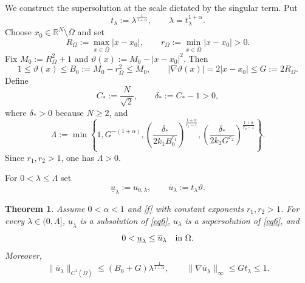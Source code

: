 \documentclass[11pt,leqno]{amsart}
\newtheorem{theorem}{Theorem}[section]
\begin{document}
We construct the supersolution at the scale dictated by the singular
term. Put
\[
 t_\lambda:=\lambda^{\frac1{1+\alpha}},\qquad
 \lambda=t_\lambda^{1+\alpha}.
\]
Choose $x_0\in\mathbb R^N\setminus\overline\Omega$ and set
\[
 R_\Omega:=\max_{x\in\overline\Omega}|x-x_0|,\qquad
 r_\Omega:=\min_{x\in\overline\Omega}|x-x_0|>0.
\]
Fix $M_0:=R_\Omega^2+1$ and $\vartheta(x):=M_0-|x-x_0|^2$. Then
\begin{equation}\label{beta-bounds}
1\le\vartheta(x)\le B_0:=M_0-r_\Omega^2\le M_0,\qquad
|\nabla\vartheta(x)|=2|x-x_0|\le G:=2R_\Omega.
\end{equation}
Define
\begin{equation}\label{cstar}
 C_*:=\frac{N}{\sqrt2},\qquad \delta_*:=C_*-1>0,
\end{equation}
where $\delta_*>0$ because $N\ge2$, and
\begin{equation}\label{Lambda-explicit}
\boxed{\Lambda:=\min\left\{
1,G^{-(1+\alpha)},
\left(\frac{\delta_*}{2k_1B_0^{r_1}}\right)^{\frac{1+\alpha}{r_1-1}},
\left(\frac{\delta_*}{2k_2G^{r_2}}\right)^{\frac{1+\alpha}{r_2-1}}
\right\}.}
\end{equation}
Since $r_1,r_2>1$, one has $\Lambda>0$.

For $0<\lambda\le\Lambda$ set
\begin{equation}\label{subsuper-def}
 \underline u_\lambda:=u_{0,\lambda},\qquad
 \overline u_\lambda:=t_\lambda\vartheta.
\end{equation}

\begin{theorem}\label{Th2}
Assume $0<\alpha<1$ and \eqref{f} with constant exponents $r_1,r_2>1$.
For every $\lambda\in(0,\Lambda]$, $\underline u_\lambda$ is a subsolution
of \eqref{eq6}, $\overline u_\lambda$ is a supersolution of \eqref{eq6}, and
\[
0<\underline u_\lambda\le\overline u_\lambda\quad\hbox{in }\Omega.
\]
Moreover,
\begin{equation}\label{super-C1}
\|\overline u_\lambda\|_{C^1(\overline\Omega)}
\le(B_0+G)\lambda^{\frac1{1+\alpha}},
\qquad
\|\nabla\overline u_\lambda\|_\infty\le Gt_\lambda\le1.
\end{equation}
\end{theorem}
\end{document}
